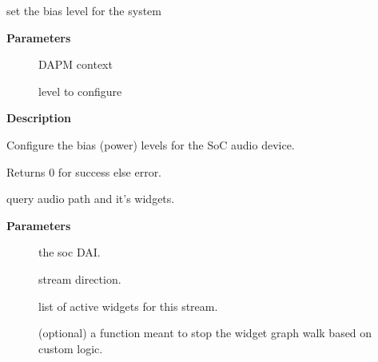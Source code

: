 \documentclass[a4paper,8pt,english]{sphinxmanual}
\begin{document}
\begin{fulllineitems}
\label{sound/kernel-api/alsa-driver-api:c.snd_soc_dapm_set_bias_level}
set the bias level for the system

\end{fulllineitems}


\textbf{Parameters}
\begin{description}
\item[{}] \leavevmode
DAPM context

\item[{}] \leavevmode
level to configure

\end{description}

\textbf{Description}

Configure the bias (power) levels for the SoC audio device.

Returns 0 for success else error.

\begin{fulllineitems}
\label{sound/kernel-api/alsa-driver-api:c.snd_soc_dapm_dai_get_connected_widgets}
query audio path and it's widgets.

\end{fulllineitems}


\textbf{Parameters}
\begin{description}
\item[{}] \leavevmode
the soc DAI.

\item[{}] \leavevmode
stream direction.

\item[{}] \leavevmode
list of active widgets for this stream.

\item[{}] \leavevmode
(optional) a function meant to stop the widget graph
walk based on custom logic.

\end{description}
\end{document}
